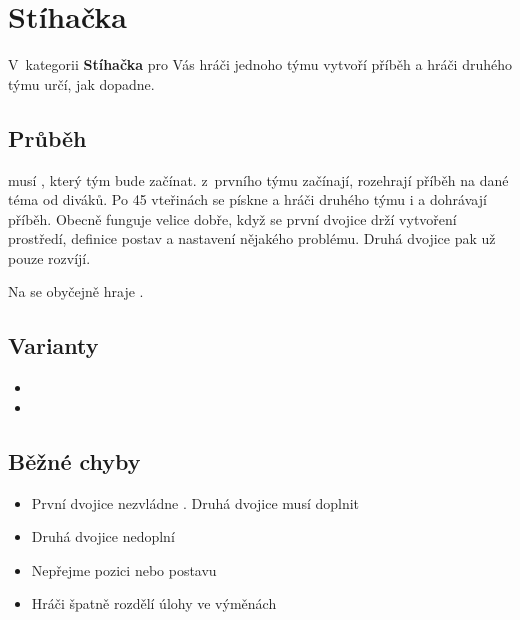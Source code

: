  
 
 
\needspace{5cm} \section{Stíhačka} \label{stíhačka}  
 
V~kategorii \textbf{Stíhačka} pro Vás hráči jednoho týmu vytvoří příběh a hráči druhého týmu určí, jak dopadne. 
 
 
\subsection{Průběh}  musí , který tým bude začínat.  z~prvního týmu začínají, rozehrají příběh na dané téma od diváků. Po 45 vteřinách se pískne a hráči druhého týmu  i  a dohrávají příběh. Obecně funguje velice dobře, když se první dvojice drží vytvoření prostředí, definice postav a nastavení nějakého problému. Druhá dvojice pak už pouze rozvíjí. 
 
Na  se obyčejně hraje . 
 
\subsection{ Varianty } \begin{itemize}
\item {}
\item {}
\end{itemize}
 
\subsection{ Běžné chyby } \begin{itemize}
\item První dvojice nezvládne . Druhá dvojice musí doplnit
\item Druhá dvojice nedoplní
\item Nepřejme pozici nebo postavu
\item Hráči špatně rozdělí úlohy ve výměnách
\end{itemize}
 
 
 
